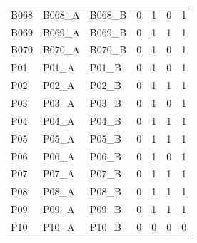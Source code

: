 \begin{table}
\begin{tabular}{lllrrrr}
B068 & B068\_A & B068\_B & 0 & 1 & 0 & 1 \\
B069 & B069\_A & B069\_B & 0 & 1 & 1 & 1 \\
B070 & B070\_A & B070\_B & 0 & 1 & 0 & 1 \\
P01 & P01\_A & P01\_B & 0 & 1 & 0 & 1 \\
P02 & P02\_A & P02\_B & 0 & 1 & 1 & 1 \\
P03 & P03\_A & P03\_B & 0 & 1 & 0 & 1 \\
P04 & P04\_A & P04\_B & 0 & 1 & 1 & 1 \\
P05 & P05\_A & P05\_B & 0 & 1 & 1 & 1 \\
P06 & P06\_A & P06\_B & 0 & 1 & 0 & 1 \\
P07 & P07\_A & P07\_B & 0 & 1 & 1 & 1 \\
P08 & P08\_A & P08\_B & 0 & 1 & 1 & 1 \\
P09 & P09\_A & P09\_B & 0 & 1 & 1 & 1 \\
P10 & P10\_A & P10\_B & 0 & 0 & 0 & 0 \\
\bottomrule
\end{tabular}
\end{table}
